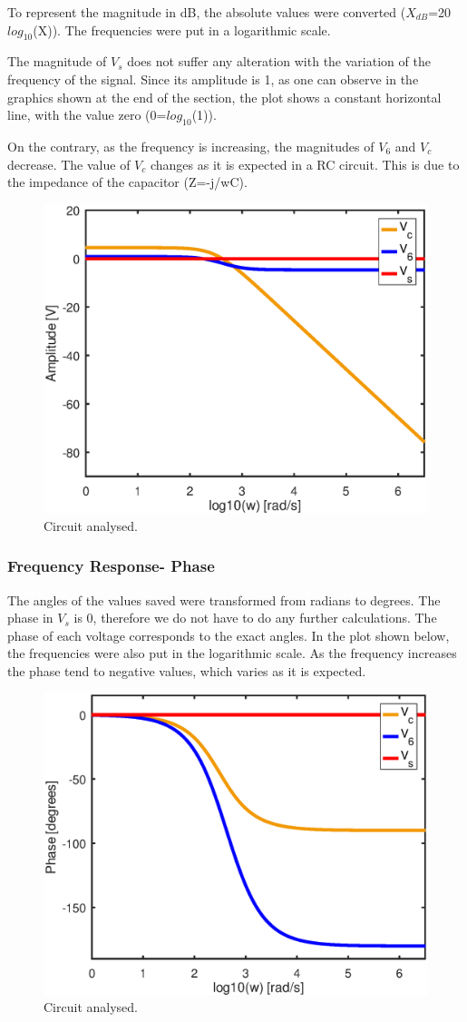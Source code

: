 To represent the magnitude in dB, the absolute values were converted ($X_{dB}$=20$log_{10}$(X)). The frequencies were put in a logarithmic scale.

The magnitude of $V_s$ does not suffer any alteration with the variation of the frequency of the signal. Since its amplitude is 1, as one can observe in the graphics shown at the end of the section, the plot shows a constant horizontal line, with the value zero (0=$log_{10}$(1)).

On the contrary, as the frequency is increasing, the magnitudes of $V_6$ and $V_c$ decrease. The value of $V_c$ changes as it is expected in a RC circuit. This is due to the impedance of the capacitor (Z=-j/wC).

\begin{figure}[h] \centering
\includegraphics[width=0.9\linewidth]{part6_amp.eps}
\caption{Circuit analysed.}
\label{RC Circuit.}
\end{figure}

\subsubsection{Frequency Response- Phase}


The angles of the values saved were transformed from radians to degrees. The phase in $V_s$ is 0, therefore we do not have to do any further calculations. The phase of each voltage corresponds to the exact angles. In the plot shown below, the frequencies were also  put in the logarithmic scale. As the frequency increases the phase tend to negative values, which varies as it is expected.

\begin{figure}[h] \centering
\includegraphics[width=0.4\linewidth]{part6_ang.eps}
\caption{Circuit analysed.}
\label{RC Circuit.}
\end{figure}













